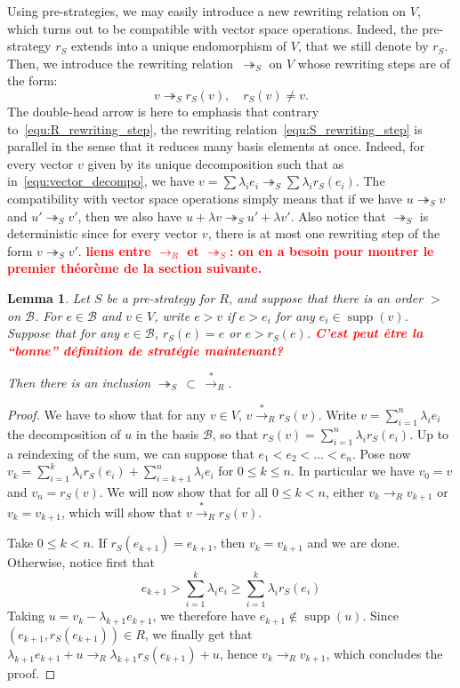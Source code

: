 \documentclass[10pt]{easychair}
\newtheorem{lemma}[theorem]{Lemma}
\theoremstyle{definition}
\newcommand\todo[1]{{\bf\textcolor{red}{#1}}}
\DeclareMathOperator{\supp}{supp}
\newcommand\basis{\mathscr{B}}
\newcommand\rewR{\to_R}
\newcommand\rewS{\twoheadrightarrow_S}
\newcommand\transR{\overset{*}{\to}_R}
\begin{document}
Using pre-strategies, we may easily introduce a new rewriting relation on
$V$, which turns out to be compatible with vector space operations.
Indeed, the pre-strategy $r_S$ extends into a unique endomorphism of $V$,
that we still denote by $r_S$. Then, we introduce the rewriting
relation~$\rewS$ on $V$ whose rewriting steps are of the form:
\begin{equation}\label{equ:S_rewriting_step}
  v\rewS r_S(v),\quad r_S(v)\neq v.
\end{equation}
The double-head arrow is here to emphasis that contrary
to~\eqref{equ:R_rewriting_step}, the rewriting
relation~\eqref{equ:S_rewriting_step} is parallel in the sense that it
reduces many basis elements at once. Indeed, for every vector $v$ given
by its unique decomposition such that as in~\eqref{equ:vector_decompo},
we have $v=\sum\lambda_ie_i\rewS\sum\lambda_ir_S(e_i)$. The compatibility
with vector space operations simply means that if we have $u\rewS v$ and
$u'\rewS v'$, then we also have $u+\lambda v\rewS u'+\lambda v'$. Also
notice that $\rewS$ is deterministic since for every vector $v$, there is 
at most one rewriting step of the form $v\rewS v'$. \todo{liens entre
  $\rewR$ et $\rewS$: on en a besoin pour montrer le premier théorème de la
section suivante.}
\smallskip


\begin{lemma}
  Let $S$ be a pre-strategy for $R$, and suppose that there is an order $>$ on
  $\basis$. For $e \in \basis$ and $v \in V$, write $e > v$ if $e > e_i$ for any
  $e_i \in \supp(v)$. Suppose that for any $e \in \basis$, $r_S(e) = e$ or
  $e > r_S(e)$. \todo{C'est peut être la ``bonne'' définition de stratégie
    maintenant?}

  Then there is an inclusion $\rewS \, \subset \, \transR$.
\end{lemma}
\begin{proof}
  We have to show that for any $v \in V$, $v \transR r_S(v)$. Write
  $v = \sum_{i = 1}^n \lambda_i e_i$ the decomposition of $u$ in the basis
  $\basis$, so that $r_S(v)= \sum_{i = 1}^n \lambda_i r_S(e_i)$. Up to a reindexing of
  the sum, we can suppose that $e_1 < e_2 < \ldots < e_n$. Pose now
  $v_k = \sum_{i = 1}^k \lambda_i r_S(e_i) + \sum_{i = k+1}^n \lambda_i e_i$ for
  $0 \leq k \leq n$.  In particular we have $v_0 = v$ and $v_n = r_S(v)$. We will now
  show that for all $0 \leq k < n$, either $v_k \rewR v_{k+1}$ or
  $v_k = v_{k+1}$, which will show that $v \transR r_S(v)$.

  Take $0 \leq k < n$. If $r_S(e_{k+1}) = e_{k+1}$, then $v_k = v_{k+1}$ and we are done.
  Otherwise, notice first that
  \[
    e_{k+1} > \sum_{i = 1}^k \lambda_i e_i \geq \sum_{i = 1}^k \lambda_ir_S(e_i)
  \]
  Taking $u = v_k - \lambda_{k+1} e_{k+1}$, we therefore have
  $e_{k+1} \notin \supp(u)$. Since $(e_{k+1},r_S(e_{k+1})) \in R$, we finally get that
  $\lambda_{k+1} e_{k+1} + u \rewR \lambda_{k+1} r_S(e_{k+1}) + u$, hence
  $v_k \rewR v_{k+1}$, which concludes the proof.
 \end{proof}
\end{document}
